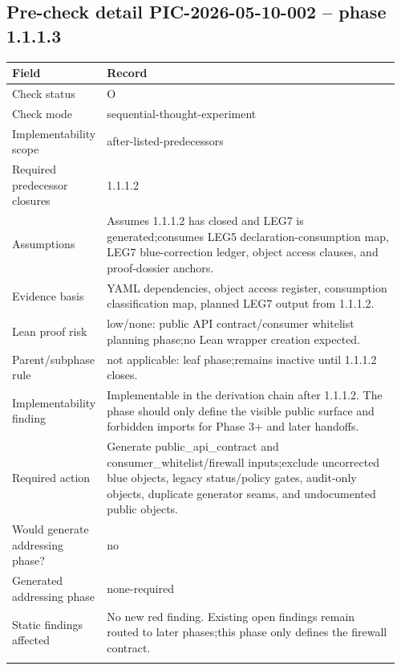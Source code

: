 \subsection*{Pre-check detail PIC-2026-05-10-002 -- phase 1.1.1.3}
\begin{longtable}{L{0.18\linewidth} L{0.78\linewidth}}
\hline
\textbf{Field} & \textbf{Record}\\
\hline
Check status & O\\
\hline\addlinespace[0.20em]
Check mode & sequential-thought-experiment\\
\hline\addlinespace[0.20em]
Implementability scope & after-listed-predecessors\\
\hline\addlinespace[0.20em]
Required predecessor closures & 1.1.1.2\\
\hline\addlinespace[0.20em]
Assumptions & Assumes 1.1.1.2 has closed and LEG7 is generated;\newline consumes LEG5 declaration-consumption map, LEG7 blue-correction ledger, object access clauses, and proof-dossier anchors.\\
\hline\addlinespace[0.20em]
Evidence basis & YAML dependencies, object access register, consumption classification map, planned LEG7 output from 1.1.1.2.\\
\hline\addlinespace[0.20em]
Lean proof risk & low/\allowbreak{}none: public API contract/\allowbreak{}consumer whitelist planning phase;\newline no Lean wrapper creation expected.\\
\hline\addlinespace[0.20em]
Parent/\allowbreak{}subphase rule & not applicable: leaf phase;\newline remains inactive until 1.1.1.2 closes.\\
\hline\addlinespace[0.20em]
Implementability finding & Implementable in the derivation chain after 1.1.1.2. The phase should only define the visible public surface and forbidden imports for Phase 3+ and later handoffs.\\
\hline\addlinespace[0.20em]
Required action & Generate public\_api\_contract and consumer\_whitelist/\allowbreak{}firewall inputs;\newline exclude uncorrected blue objects, legacy status/\allowbreak{}policy gates, audit-only objects, duplicate generator seams, and undocumented public objects.\\
\hline\addlinespace[0.20em]
Would generate addressing phase? & no\\
\hline\addlinespace[0.20em]
Generated addressing phase & none-required\\
\hline\addlinespace[0.20em]
Static findings affected & No new red finding. Existing open findings remain routed to later phases;\newline this phase only defines the firewall contract.\\
\hline\addlinespace[0.20em]
\end{longtable}
